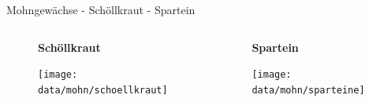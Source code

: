  \begin{frame}[t,label=schoellkraut]{Mohngewächse - Schöllkraut - Spartein }
    \begin{columns}[onlytextwidth,t]
      \begin{column}{0.6\textwidth}
        \begin{minipage}[c][0.9\textheight][l]{\linewidth}
          \begin{figure}
            \textbf{Schöllkraut}\par\medskip
            \texttt{[image: data/mohn/schoellkraut]}%
          \end{figure} 
        \end{minipage}
      \end{column}
      \begin{column}{0.4\textwidth}
        \begin{minipage}[c][0.9\textheight][l]{\linewidth}
          \begin{figure}
            \textbf{Spartein}\par\medskip
            \texttt{[image: data/mohn/sparteine]}%
          \end{figure} 
        \end{minipage}
      \end{column}
    \end{columns}
  \end{frame}

